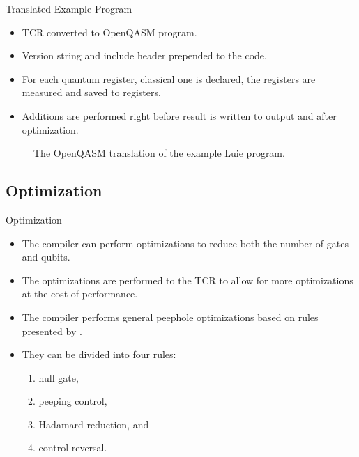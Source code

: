 \begin{frame}{Translated Example Program}    
    \begin{minipage}{.45\textwidth}
        \begin{itemize}
            \item TCR converted to OpenQASM program.
            \item Version string and include header prepended to the code.
            \item For each quantum register, classical one is declared, the registers are measured and saved to registers. 
            \item Additions are performed right before result is written to output and after optimization.
        \end{itemize}
    \end{minipage}
    \hfill
    \begin{minipage}{.50\textwidth}
        \centering
        \vfill
        \begin{figure}
            \centering
            
            \caption{The OpenQASM translation of the example Luie program.}
        \end{figure}
        \vfill
    \end{minipage}
\end{frame}

\subsection{Optimization}
\begin{frame}{Optimization}
    \begin{itemize}
        \item The compiler can perform optimizations to reduce both the number of gates and qubits.
        \item The optimizations are performed to the TCR to allow for more optimizations at the cost of performance.
        \item The compiler performs general peephole optimizations based on rules presented by \cite{GaCh11}.
        \item They can be divided into four rules:
        \begin{enumerate}
            \item null gate, 
            \item peeping control, 
            \item Hadamard reduction, and
            \item control reversal. 
        \end{enumerate}
    \end{itemize}
\end{frame}

